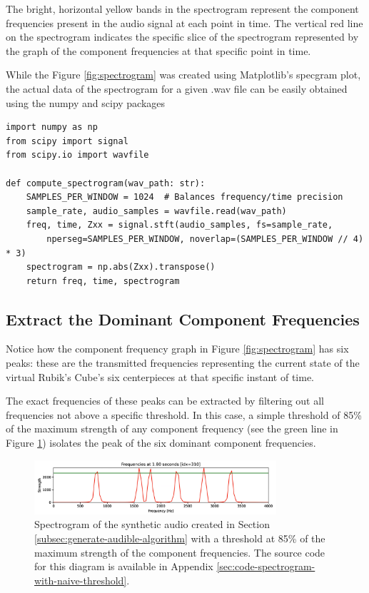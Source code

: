 The bright, horizontal yellow bands in the spectrogram represent the component frequencies present in the audio signal at each point in time.
The vertical red line on the spectrogram indicates the specific slice of the spectrogram represented by the graph of the component frequencies at that specific point in time.

While the Figure \ref{fig:spectrogram} was created using Matplotlib's specgram plot, the actual data of the spectrogram for a given .wav file can be easily obtained using the numpy and scipy packages

\begin{verbatim}
import numpy as np
from scipy import signal
from scipy.io import wavfile

def compute_spectrogram(wav_path: str):
    SAMPLES_PER_WINDOW = 1024  # Balances frequency/time precision
    sample_rate, audio_samples = wavfile.read(wav_path)
    freq, time, Zxx = signal.stft(audio_samples, fs=sample_rate,
        nperseg=SAMPLES_PER_WINDOW, noverlap=(SAMPLES_PER_WINDOW // 4) * 3)
    spectrogram = np.abs(Zxx).transpose()
    return freq, time, spectrogram
\end{verbatim}

\newpage
\subsection{Extract the Dominant Component Frequencies}
\label{subsec:extract-dominant-freqs}
Notice how the component frequency graph in Figure \ref{fig:spectrogram} has six peaks: these are the transmitted frequencies representing the current state of the virtual Rubik's Cube's six centerpieces at that specific instant of time.

The exact frequencies of these peaks can be extracted by filtering out all frequencies not above a specific threshold.
In this case, a simple threshold of 85\% of the maximum strength of any component frequency (see the green line in Figure \ref{fig:spectrogram-with-naive-threshold}) isolates the peak of the six dominant component frequencies.

\begin{figure}[h]
    \centering
    \includegraphics[width=0.8\textwidth]{Figures/5 Algorithm Design/threshold.png}
    \caption{Spectrogram of the synthetic audio created in Section \ref{subsec:generate-audible-algorithm} with a threshold at 85\% of the maximum strength of the component frequencies. The source code for this diagram is available in Appendix \ref{sec:code-spectrogram-with-naive-threshold}.}
    \label{fig:spectrogram-with-naive-threshold}
\end{figure}

